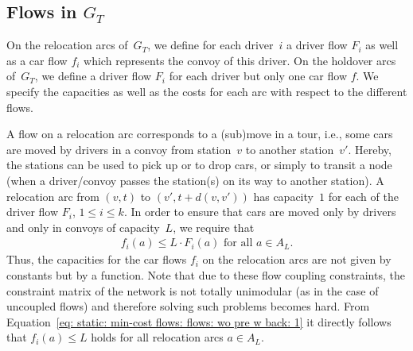 \documentclass[english]{llncs}
\numberwithin{sublemma}{lemma}
\newcommand{\capd}{\ensuremath{L}}
\newcommand{\dist}{\ensuremath{d}}
\newcommand{\fc}{\ensuremath{f}}
\newcommand{\fd}{\ensuremath{F}}
\begin{document}
\subsection{Flows in \texorpdfstring{$G_T$}{GT}}
\label{sec: static: min-cost flows: flows: wo pre w back}


On the relocation arcs of~$G_T$, we define for each driver~$i$ a driver flow $\fd_i$ as well as a car flow $\fc_i$ which represents the convoy of this driver.
On the holdover arcs of~$G_T$, we define a driver flow $\fd_i$ for each driver but only one car flow $\fc$.
We specify the capacities as well as the costs for each arc with respect to the different flows.


A flow on a relocation arc corresponds to a (sub)move in a tour, i.e., some cars are moved by drivers in a convoy from station~$v$ to another station~$v'$.
Hereby, the stations can be used to pick up or to drop cars, or simply to transit a node (when a driver/convoy passes the station(s) on its way to another station).
A relocation arc from $(v,t)$ to $(v', t + \dist(v,v'))$ has capacity~$1$ for each of the driver flow $\fd_i$, $1 \leq i \leq k$.
In order to ensure that cars are moved only by drivers and only in convoys of capacity~$\capd$, we require that 
\begin{align} \label{eq: static: min-cost flows: flows: wo pre w back: 1}
  \fc_i(a) \leq \capd \cdot \fd_i(a) \text{ for all $a \in A_L$.}
\end{align}
Thus, the capacities for the car flows $\fc_i$ on the relocation arcs are not given by constants but by a function.
Note that due to these flow coupling constraints, the constraint matrix 
of the network is not totally unimodular (as in the case of uncoupled flows) and therefore solving such problems becomes hard.
From Equation~\eqref{eq: static: min-cost flows: flows: wo pre w back: 1} it directly follows that $\fc_i(a) \leq \capd$ holds for all relocation arcs $a \in A_L$.
\end{document}
